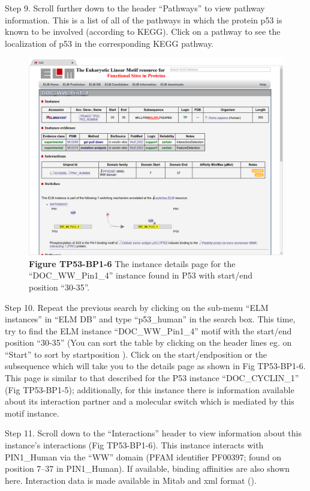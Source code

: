 Step 9. Scroll further down to the header ``Pathways'' to view pathway
information. This is a list of all of the pathways in which the protein
p53 is known to be involved (according to KEGG). Click on a pathway to
see the localization of p53 in the corresponding KEGG pathway.

\begin{figure}[h!]
\centering
\includegraphics[width=\textwidth]{Figures/TP53_1/doc_ww_pin_1_4_instance.png}
\caption{
\textbf{Figure TP53-BP1-6} The instance details page for the
``DOC\_WW\_Pin1\_4'' instance found in P53 with start/end position
``30-35''.
}
\end{figure}

Step 10. Repeat the previous search by clicking on the sub-menu ``ELM
instances'' in ``ELM DB'' and type ``p53\_human'' in the search box.
This time, try to find the ELM instance ``DOC\_WW\_Pin1\_4'' motif with
the start/end position ``30-35'' (You can sort the table by clicking on
the header lines eg. on ``Start'' to sort by startposition ). Click on
the start/endposition or the subsequence which will take you to the
details page as shown in Fig TP53-BP1-6. This page is similar to that
described for the P53 instance ``DOC\_CYCLIN\_1'' (Fig TP53-BP1-5);
additionally, for this instance there is information available about its
interaction partner and a molecular switch which is mediated by this
motif instance.

Step 11. Scroll down to the ``Interactions'' header to view information
about this instance's interactions (Fig TP53-BP1-6). This instance
interacts with PIN1\_Human via the ``WW'' domain (PFAM identifier
PF00397; found on position 7--37 in PIN1\_Human). If available, binding
affinities are also shown here. Interaction data is made available in
Mitab and xml format (\cite{17925023}).

